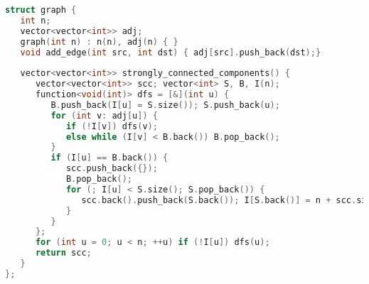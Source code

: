 \begin{lstlisting}[language=C++]
struct graph {
   int n;
   vector<vector<int>> adj;
   graph(int n) : n(n), adj(n) { }
   void add_edge(int src, int dst) { adj[src].push_back(dst);}
	
   vector<vector<int>> strongly_connected_components() {
      vector<vector<int>> scc; vector<int> S, B, I(n);
      function<void(int)> dfs = [&](int u) {
         B.push_back(I[u] = S.size()); S.push_back(u);
         for (int v: adj[u]) {
            if (!I[v]) dfs(v);
            else while (I[v] < B.back()) B.pop_back();
         }
         if (I[u] == B.back()) {
            scc.push_back({});
            B.pop_back();
            for (; I[u] < S.size(); S.pop_back()) {
               scc.back().push_back(S.back()); I[S.back()] = n + scc.size();
            }
         }
      };
      for (int u = 0; u < n; ++u) if (!I[u]) dfs(u);
      return scc;
   }
};
\end{lstlisting}